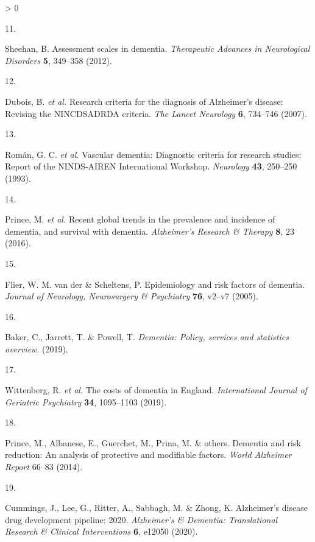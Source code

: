 \documentclass[a4paper, twoside]{templates/ociamthesis}
\newlength{\cslhangindent}
\newlength{\csllabelwidth}
\newenvironment{CSLReferences}[3] %
 {%
  \setlength{\parindent}{0pt}
  \ifodd #1 \everypar{\setlength{\hangindent}{\cslhangindent}}\ignorespaces\fi
  \ifnum #2 > 0
  \setlength{\parskip}{#2\baselineskip}
  \fi
 }%
 {}
\newcommand{\CSLLeftMargin}[1]{\parbox[t]{\maxof{\widthof{#1}}{\csllabelwidth}}{#1}}
\newcommand{\CSLRightInline}[1]{\parbox[t]{\linewidth - \csllabelwidth}{#1}}
\begin{document}
\begin{CSLReferences}{0}{0}
\leavevmode\hypertarget{ref-sheehan2012}{}%
\CSLLeftMargin{11. }
\CSLRightInline{Sheehan, B. Assessment scales in dementia. \emph{Therapeutic Advances in Neurological Disorders} \textbf{5}, 349--358 (2012).}

\leavevmode\hypertarget{ref-dubois2007}{}%
\CSLLeftMargin{12. }
\CSLRightInline{Dubois, B. \emph{et al.} Research criteria for the diagnosis of {Alzheimer}'s disease: Revising the {NINCDS}{{ADRDA}} criteria. \emph{The Lancet Neurology} \textbf{6}, 734--746 (2007).}

\leavevmode\hypertarget{ref-roman1993}{}%
\CSLLeftMargin{13. }
\CSLRightInline{Román, G. C. \emph{et al.} Vascular dementia: Diagnostic criteria for research studies: Report of the {NINDS}-{AIREN International Workshop}. \emph{Neurology} \textbf{43}, 250--250 (1993).}

\leavevmode\hypertarget{ref-prince2016}{}%
\CSLLeftMargin{14. }
\CSLRightInline{Prince, M. \emph{et al.} Recent global trends in the prevalence and incidence of dementia, and survival with dementia. \emph{Alzheimer's Research \& Therapy} \textbf{8}, 23 (2016).}

\leavevmode\hypertarget{ref-flier2005}{}%
\CSLLeftMargin{15. }
\CSLRightInline{Flier, W. M. van der \& Scheltens, P. Epidemiology and risk factors of dementia. \emph{Journal of Neurology, Neurosurgery \& Psychiatry} \textbf{76}, v2--v7 (2005).}

\leavevmode\hypertarget{ref-baker2019}{}%
\CSLLeftMargin{16. }
\CSLRightInline{Baker, C., Jarrett, T. \& Powell, T. \emph{Dementia: Policy, services and statistics overview}. (2019).}

\leavevmode\hypertarget{ref-wittenberg2019}{}%
\CSLLeftMargin{17. }
\CSLRightInline{Wittenberg, R. \emph{et al.} The costs of dementia in {England}. \emph{International Journal of Geriatric Psychiatry} \textbf{34}, 1095--1103 (2019).}

\leavevmode\hypertarget{ref-prince2014}{}%
\CSLLeftMargin{18. }
\CSLRightInline{Prince, M., Albanese, E., Guerchet, M., Prina, M. \& others. Dementia and risk reduction: An analysis of protective and modifiable factors. \emph{World Alzheimer Report} 66--83 (2014).}

\leavevmode\hypertarget{ref-cummings2020}{}%
\CSLLeftMargin{19. }
\CSLRightInline{Cummings, J., Lee, G., Ritter, A., Sabbagh, M. \& Zhong, K. Alzheimer's disease drug development pipeline: 2020. \emph{Alzheimer's \& Dementia: Translational Research \& Clinical Interventions} \textbf{6}, e12050 (2020).}


\end{CSLReferences}
\end{document}
